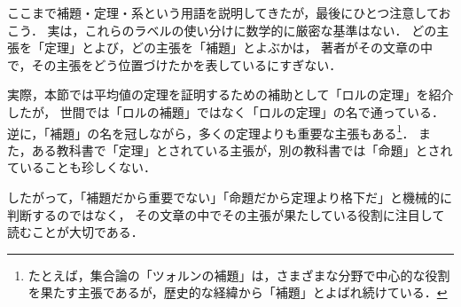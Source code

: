 ここまで補題・定理・系という用語を説明してきたが，最後にひとつ注意しておこう．
実は，これらのラベルの使い分けに数学的に厳密な基準はない．
どの主張を「定理」とよび，どの主張を「補題」とよぶかは，
著者がその文章の中で，その主張をどう位置づけたかを表しているにすぎない．
 
実際，本節では平均値の定理を証明するための補助として「ロルの定理」を紹介したが，
世間では「ロルの補題」ではなく「ロルの定理」の名で通っている．
逆に，「補題」の名を冠しながら，多くの定理よりも重要な主張もある\footnote{たとえば，集合論の「ツォルンの補題」は，さまざまな分野で中心的な役割を果たす主張であるが，歴史的な経緯から「補題」とよばれ続けている．}．
また，ある教科書で「定理」とされている主張が，別の教科書では「命題」とされていることも珍しくない．
 
したがって，「補題だから重要でない」「命題だから定理より格下だ」と機械的に判断するのではなく，
その文章の中でその主張が果たしている役割に注目して読むことが大切である．

